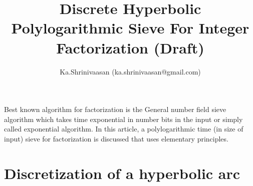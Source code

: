 \documentclass[11pt,onecolumn]{article}
\author{ Ka.Shrinivaasan (ka.shrinivaasan@gmail.com) }
\title{Discrete Hyperbolic Polylogarithmic Sieve For Integer Factorization (Draft)}
\begin{document}
\thispagestyle{empty}
\pagestyle{empty}
\maketitle
\begin{onecolabstract}
Best known algorithm for factorization is the General number field sieve algorithm which takes time
exponential in number bits in the input or simply called exponential algorithm. In this article, a polylogarithmic time (in size of input) sieve for factorization is discussed that uses elementary principles.
\end{onecolabstract}

\section{Discretization of a hyperbolic arc}
\end{document}
